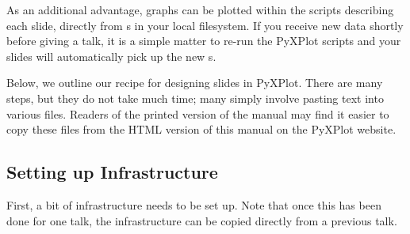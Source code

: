 As an additional advantage, graphs can be plotted within the scripts describing
each slide, directly from \datafile s in your local filesystem. If you receive
new data shortly before giving a talk, it is a simple matter to re-run the
PyXPlot scripts and your slides will automatically pick up the new \datafile s.

Below, we outline our recipe for designing slides in PyXPlot. There are many
steps, but they do not take much time; many simply involve pasting text into
various files. Readers of the printed version of the manual may find it easier
to copy these files from the HTML version of this manual on the PyXPlot
website.

\subsection{Setting up Infrastructure}

First, a bit of infrastructure needs to be set up. Note that once this has been
done for one talk, the infrastructure can be copied directly from a previous
talk.

